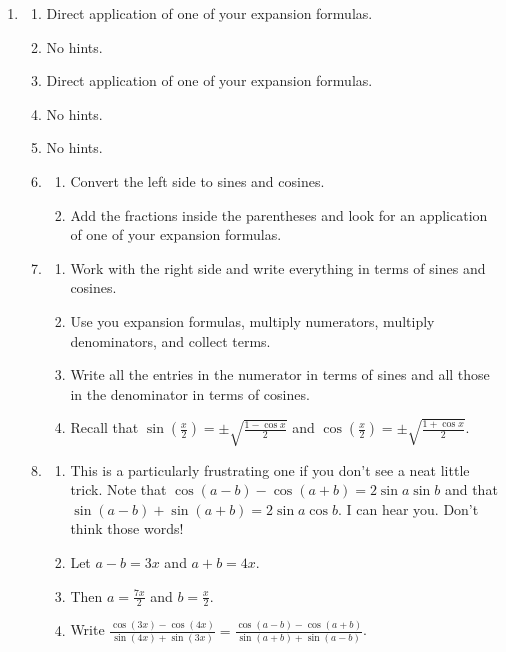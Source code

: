 \documentclass[english]{book}
\begin{document}
\begin{enumerate}
    \item \begin{enumerate} %
        \item Direct application of one of your expansion formulas.
        \item No hints.
        \item Direct application of one of your expansion formulas.
        \item No hints.
        \item No hints.
        \item \begin{enumerate}[\hspace{1cm}a)]
                \item Convert the left side to sines and cosines.
                \item Add the fractions inside the parentheses and look for an application of one of your expansion formulas.
              \end{enumerate}
        \item \begin{enumerate}[\hspace{1cm}a)]
                \item Work with the right side and write everything in terms of sines and cosines.
                \item Use you expansion formulas, multiply numerators, multiply denominators, and collect terms.
                \item Write all the entries in the numerator in terms of sines and all those in the denominator in terms of cosines.
                \item Recall that $\sin(\frac{x}{2}) = \pm \sqrt{\frac{1 - \cos x}{2}}$ and $\cos(\frac{x}{2}) = \pm \sqrt{\frac{1+ \cos x}{2}}$.
              \end{enumerate}
        \item \begin{enumerate}[\hspace{1cm}a)]
                \item This is a particularly frustrating one if you don't see a neat little trick. Note that $\cos(a-b) - \cos(a+b) = 2 \sin a \sin b$ and that $\sin(a-b) + \sin(a+b) = 2 \sin a \cos b$. I can hear you. Don't think those words!
                \item Let $a-b=3x$ and $a+b=4x$.
                \item Then $a=\frac{7x}{2}$ and $b=\frac{x}{2}$.
                \item Write $\frac{\cos(3x) - \cos(4x)}{\sin(4x) + \sin(3x)} = \frac{\cos(a-b) - \cos(a+b)}{\sin(a+b) + \sin(a-b)}$.

\end{enumerate}
\end{enumerate}
\end{enumerate}
\end{document}
